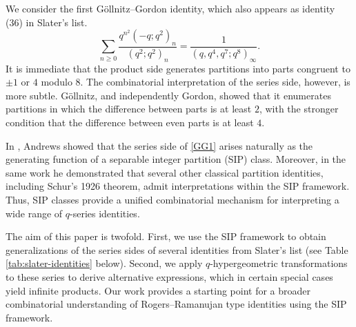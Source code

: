 \documentclass[12pt]{amsart}
\theoremstyle{definition}
\theoremstyle{remark}
\numberwithin{equation}{section}
\begin{document}
We consider the first G\"{o}llnitz--Gordon identity, which also appears as identity (36) in Slater's list.
\begin{equation}\label{GG1}
\sum_{n\ge0}\frac{q^{n^2}(-q;q^2)_n}{(q^2;q^2)_n}
=
\frac{1}{(q,q^4,q^7;q^8)_\infty}.
\end{equation}
It is immediate that the product side generates partitions into parts congruent to $\pm 1$ or $4$ modulo $8$. The combinatorial interpretation of the series side, however, is more subtle. G\"ollnitz, and independently Gordon, showed that it enumerates partitions in which the difference between parts is at least $2$, with the stronger condition that the difference between even parts is at least $4$.

In \cite{AndrewsSIP}, Andrews showed that the series side of \eqref{GG1} arises naturally as the generating function of a separable integer partition (SIP) class. Moreover, in the same work he demonstrated that several other classical partition identities, including Schur's 1926 theorem, admit interpretations within the SIP framework. Thus, SIP classes provide a unified combinatorial mechanism for interpreting a wide range of $q$-series identities.

The aim of this paper is twofold. First, we use the SIP framework to obtain generalizations of the series sides of several identities from Slater's list (see Table \ref{tab:slater-identities} below). Second, we apply $q$-hypergeometric transformations to these series to derive alternative expressions, which in certain special cases yield infinite products. Our work provides a starting point for a broader combinatorial understanding of Rogers--Ramanujan type identities using the SIP framework. 
\end{document}
